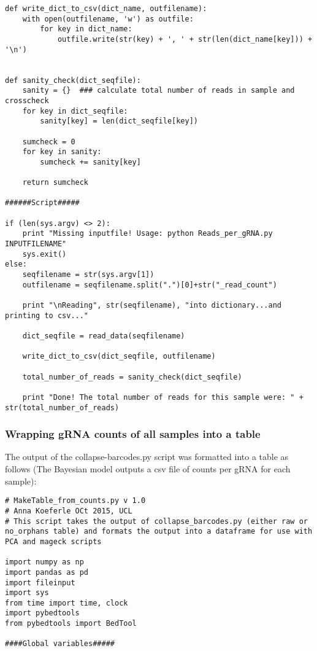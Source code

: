 \begin{footnotesize}
\begin{lstlisting}
def write_dict_to_csv(dict_name, outfilename):
    with open(outfilename, 'w') as outfile:
        for key in dict_name:
            outfile.write(str(key) + ', ' + str(len(dict_name[key])) + '\n')


def sanity_check(dict_seqfile):
    sanity = {}  ### calculate total number of reads in sample and crosscheck
    for key in dict_seqfile:
        sanity[key] = len(dict_seqfile[key])

    sumcheck = 0
    for key in sanity:
        sumcheck += sanity[key]

    return sumcheck

######Script#####

if (len(sys.argv) <> 2):
    print "Missing inputfile! Usage: python Reads_per_gRNA.py INPUTFILENAME"
    sys.exit()
else:
    seqfilename = str(sys.argv[1])
    outfilename = seqfilename.split(".")[0]+str("_read_count")

    print "\nReading", str(seqfilename), "into dictionary...and printing to csv..."

    dict_seqfile = read_data(seqfilename)

    write_dict_to_csv(dict_seqfile, outfilename)

    total_number_of_reads = sanity_check(dict_seqfile)

    print "Done! The total number of reads for this sample were: " + str(total_number_of_reads)

\end{lstlisting}


\subsubsection{Wrapping gRNA counts of all samples into a table}

The output of the collapse-barcodes.py script was formatted into a table as follows (The Bayesian model outputs a csv file of counts per gRNA for each sample):

\begin{lstlisting}
# MakeTable_from_counts.py v 1.0
# Anna Koeferle OCt 2015, UCL
# This script takes the output of collapse_barcodes.py (either raw or no_orphans table) and formats the output into a dataframe for use with PCA and mageck scripts

import numpy as np
import pandas as pd
import fileinput
import sys
from time import time, clock
import pybedtools
from pybedtools import BedTool

####Global variables#####


\end{lstlisting}
\end{footnotesize}
